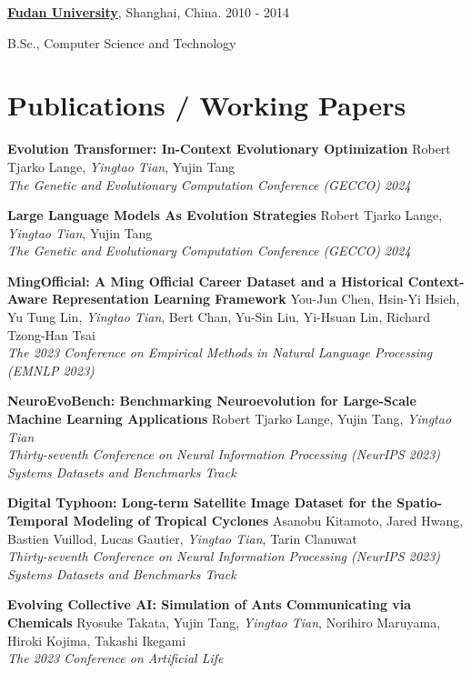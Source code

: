 \documentclass[line,margin]{cv}
\newenvironment{block}
{
  \begin{addmargin}[2em]{0em}%
}
{
  \end{addmargin}
}
\newcommand{\Fudan}{\href{http://www.fudan.edu.cn/englishnew/}{Fudan University}}
\begin{document}
\begin{resume}
  {\bf \Fudan}, Shanghai, China. \hfill 2010 - 2014

  \begin{block}
    B.Sc., Computer Science and Technology 
  \end{block}



\section{Publications / Working Papers}

  {\bf Evolution Transformer: In-Context Evolutionary Optimization}
  Robert Tjarko Lange, \emph{Yingtao Tian}, Yujin Tang\\
  \emph{The Genetic and Evolutionary Computation Conference (GECCO) 2024}
  
  {\bf Large Language Models As Evolution Strategies}
  Robert Tjarko Lange, \emph{Yingtao Tian}, Yujin Tang\\
  \emph{The Genetic and Evolutionary Computation Conference (GECCO) 2024}
  
  {\bf MingOfficial: A Ming Official Career Dataset and a Historical Context-Aware Representation Learning Framework}
  You-Jun Chen, Hsin-Yi Hsieh, Yu Tung Lin, \emph{Yingtao Tian}, Bert Chan, Yu-Sin Liu, Yi-Hsuan Lin, Richard Tzong-Han Tsai\\
  \emph{The 2023 Conference on Empirical Methods in Natural Language Processing (EMNLP 2023)}

  {\bf NeuroEvoBench: Benchmarking Neuroevolution for Large-Scale Machine Learning Applications}
  Robert Tjarko Lange, Yujin Tang, \emph{Yingtao Tian}\\
  \emph{Thirty-seventh Conference on Neural Information Processing (NeurIPS 2023) Systems Datasets and Benchmarks Track}

  {\bf Digital Typhoon: Long-term Satellite Image Dataset for the Spatio-Temporal Modeling of Tropical Cyclones}
  Asanobu Kitamoto, Jared Hwang, Bastien Vuillod, Lucas Gautier, \emph{Yingtao Tian}, Tarin Clanuwat\\
  \emph{Thirty-seventh Conference on Neural Information Processing (NeurIPS 2023) Systems Datasets and Benchmarks Track}

  {\bf Evolving Collective AI: Simulation of Ants Communicating via Chemicals}
  Ryosuke Takata, Yujin Tang, \emph{Yingtao Tian}, Norihiro Maruyama, Hiroki Kojima, Takashi Ikegami\\
  \emph{The 2023 Conference on Artificial Life}


\end{resume}
\end{document}
